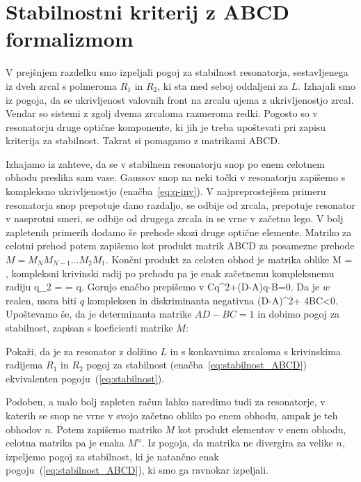 \section{Stabilnostni kriterij z ABCD formalizmom}
V prejšnjem razdelku smo izpeljali pogoj za stabilnost resonatorja, 
sestavljenega iz dveh zrcal s polmeroma $R_1$ in $R_2$, ki sta med 
seboj oddaljeni za $L$. Izhajali smo iz pogoja, da se ukrivljenost
valovnih front na zrcalu ujema z ukrivljenostjo zrcal. Vendar so sistemi z
zgolj dvema zrcaloma razmeroma redki. Pogosto so v resonatorju
druge optične komponente, ki jih je treba upoštevati pri zapisu
kriterija za stabilnost. Takrat si pomagamo z matrikami ABCD. 

Izhajamo iz zahteve, da se v stabilnem resonatorju snop po enem celotnem obhodu
preslika sam vase. Gaussov snop na neki točki v resonatorju 
zapišemo s kompleksno ukrivljenostjo (enačba~\ref{eq:q-inv}).
V najpreprostejšem primeru resonatorja snop prepotuje dano razdaljo, se odbije od zrcala, prepotuje
resonator v nasprotni smeri, se odbije od drugega zrcala in se vrne v začetno lego. V bolj 
zapletenih primerih dodamo še prehode skozi druge optične elemente. Matriko 
za celotni prehod potem zapišemo kot produkt matrik ABCD za posamezne prehode $M = M_N M_{N-1} ...M_2 M_1$.
Končni produkt za celoten obhod je matrika oblike
\beq
M = \left[\begin{array}{cc}
A & B\\
C & D
\end{array}\right],
\eeq
kompleksni krivinski radij po prehodu pa je enak začetnemu kompleksnemu radiju
\beq
q_2 =  = q.
\eeq
Gornjo enačbo prepišemo v 
\beq
Cq^2+(D-A)q-B=0.
\eeq
Da je $w$ realen, mora biti $q$ kompleksen in diskriminanta negativna
\beq
(D-A)^2+ 4BC<0.
\eeq
Upoštevamo še, da je determinanta matrike $AD-BC=1$ in dobimo pogoj za 
stabilnost, zapisan s koeficienti matrike $M$:

\begin{definition}
Pokaži, da je za resonator z dolžino $L$ in s konkavnima zrcaloma s krivinskima radijema $R_1$ in $R_2$ 
pogoj za stabilnost (enačba~\ref{eq:stabilnost_ABCD}) ekvivalenten pogoju~(\ref{eq:stabilnost}).
\end{definition}

\begin{remark}
Podoben, a malo bolj zapleten račun lahko naredimo tudi za resonatorje, v katerih se snop 
ne vrne v svojo začetno obliko po enem obhodu, ampak je teh obhodov $n$. Potem zapišemo
matriko $M$ kot produkt elementov v enem obhodu, celotna matrika pa je enaka $M^n$. Iz pogoja,
da matrika ne divergira za velike $n$, izpeljemo pogoj za stabilnost, ki je natančno 
enak pogoju~(\ref{eq:stabilnost_ABCD}), ki smo ga ravnokar izpeljali. 
\end{remark}

